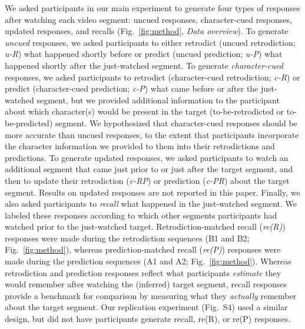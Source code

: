 \documentclass[10pt]{article}
\newcommand{\MethodsReplExp}{S4}
\begin{document}
We asked participants in our main experiment to generate four types of responses after watching each video segment: uncued responses, character-cued responses, updated responses, and recalls (Fig.~\ref{fig:method}, \textit{Data overview}). To generate \textit{uncued} responses, we asked participants to either retrodict (uncued retrodiction; \textit{u-R}) what happened shortly before or predict (uncued prediction; \textit{u-P}) what happened shortly after the just-watched segment. To generate \textit{character-cued} responses, we asked participants to retrodict (character-cued retrodiction; \textit{c-R}) or predict (character-cued prediction; \textit{c-P}) what came before or after the just-watched segment, but we provided additional information to the participant about which character(s) would be present in the target (to-be-retrodicted or to-be-predicted) segment. We hypothesized that character-cued responses should be more accurate than uncued responses, to the extent that participants incorporate the character information we provided to them into their retrodictions and predictions. To generate updated responses, we asked participants to watch an additional segment that came just prior to or just after the target segment, and then to update their retrodiction (\textit{c-RP}) or prediction (\textit{c-PR}) about the target segment. Results on updated responses are not reported in this paper. Finally, we also asked participants to \textit{recall} what happened in the just-watched segment. We labeled these responses according to which other segments participants had watched prior to the just-watched target. Retrodiction-matched recall (\textit{re(R)}) responses were made during the retrodiction sequences (B1 and B2; Fig.~\ref{fig:method}), whereas prediction-matched recall (\textit{re(P)}) responses were made during the prediction sequences (A1 and A2; Fig.~\ref{fig:method}). Whereas retrodiction and prediction responses reflect what participants \textit{estimate} they would remember after watching the (inferred) target segment, recall responses provide a benchmark for comparison by measuring what they \textit{actually} remember about the target segment. Our replication experiment (Fig.~\MethodsReplExp) used a similar design, but did not have participants generate recall, re(R), or re(P) responses.
\end{document}
